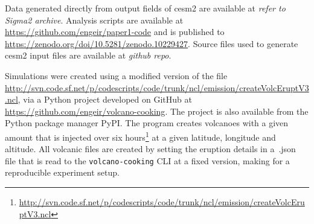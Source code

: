 \documentclass{ametsocV6.1}
\begin{document}
Data generated directly from output fields of \gls{cesm2} are available at \emph{refer
  to Sigma2 archive}. Analysis scripts are available at
\url{https://github.com/engeir/paper1-code} and is published to
\url{https://zenodo.org/doi/10.5281/zenodo.10229427}. Source files used to generate
\gls{cesm2} input files are available at \emph{github repo}.

%






%



\appendix

\appendix[A]


Simulations were created using a modified version of the file
\url{http://svn.code.sf.net/p/codescripts/code/trunk/ncl/emission/createVolcEruptV3.ncl},
via a Python project developed on GitHub at
\url{https://github.com/engeir/volcano-cooking}. The project is also available from the
Python package manager PyPI\@. The program creates volcanoes with a given 
amount that is injected over six
hours\footnote{\url{http://svn.code.sf.net/p/codescripts/code/trunk/ncl/emission/createVolcEruptV3.ncl}}
at a given latitude, longitude and altitude. All volcanic  files are created by
setting the eruption details in a~.json file that is read to the
\texttt{volcano-cooking} CLI at a fixed version, making for a reproducible experiment
setup.
\end{document}
